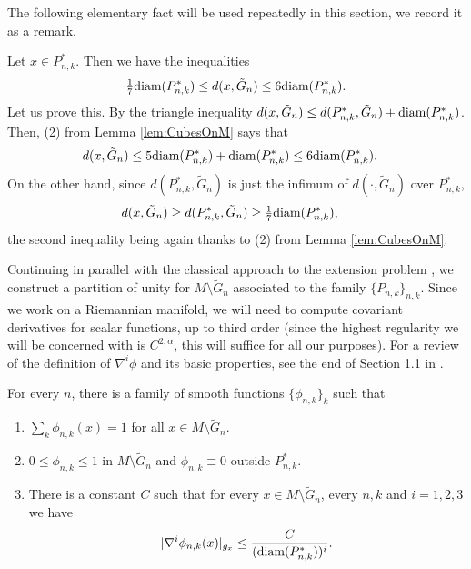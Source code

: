 \documentclass[11pt,reqno]{amsart}
\numberwithin{equation}{section}
\theoremstyle{plain}
\def\diam{\textnormal{diam}}
\begin{document}
  The following elementary fact will be used repeatedly in this section, we record it as a remark.
  \begin{rem}\label{rem: Whitney local diameter of balls}
    Let $x \in P_{n,k}^*$. Then we have the inequalities
    \begin{align*}	
      \tfrac{1}{7}\diam(P_{n,k}^*)\leq d(x,\tilde G_n) \leq 6\diam(P_{n,k}^*).
    \end{align*}	
    Let us prove this. By the triangle inequality $d(x,\tilde G_n)\leq d(P_{n,k}^*,\tilde G_n)+\diam(P_{n,k}^*)$. Then, (2) from Lemma \ref{lem:CubesOnM} says that
    \begin{align*}
      d(x,\tilde G_n) & \leq 5\diam(P_{n,k}^*)+\diam(P_{n,k}^*) \leq 6\diam(P_{n,k}^*).	 
    \end{align*}
    On the other hand, since $d(P_{n,k}^*,\tilde G_n)$ is just the infimum of $d(\cdot,\tilde G_n)$ over $P_{n,k}^*$,
    \begin{align*}
      d(x,\tilde G_n) & \geq d(P_{n,k}^*,\tilde G_n) \geq \tfrac{1}{7}\diam(P_{n,k}^*),
    \end{align*}
    the second inequality being again thanks to (2) from Lemma \ref{lem:CubesOnM}.	
  \end{rem}
  
  Continuing in parallel with the classical approach to the extension problem \cite[Chapter 6]{Stei-71}, we construct a partition of unity for $M \setminus \tilde G_n$ associated to the family $\{P_{n,k}\}_{n,k}$.  Since we work on a Riemannian manifold, we will need to compute covariant derivatives for scalar functions, up to third order  (since the highest regularity we will be concerned with is $C^{2,\alpha}$, this will suffice for all our purposes). For a review of the definition of $\nabla^i\phi$ and its basic properties, see the end of Section 1.1 in \cite[Chapter 1]{Heb-2000NonlinearAnalysisManifoldsBook}.
  \begin{lem}\label{lem:PartitionOfUnityGn}
    For every $n$, there is a family of smooth functions $\{\phi_{n,k}\}_k$ such that
    \begin{enumerate}
     \item $\sum \limits_{k} \phi_{n,k}(x) = 1$ for all $x \in M\setminus \tilde G_n$.
     \item $0\leq \phi_{n,k}\leq 1$ in $M\setminus \tilde G_n$ and $\phi_{n,k}\equiv 0$ outside $P_{n,k}^*$. 
      \item There is a constant $C$ such that for every $x\in M\setminus \tilde G_n$, every $n,k$ and $i=1,2,3$ we have 
      \begin{align*}
        |\nabla^i \phi_{n,k}(x)|_{g_x} \leq \frac{C}{(\diam(P_{n,k}^*))^i}.	  
      \end{align*}		  	  
    \end{enumerate}
  \end{lem}
  
\end{document}
